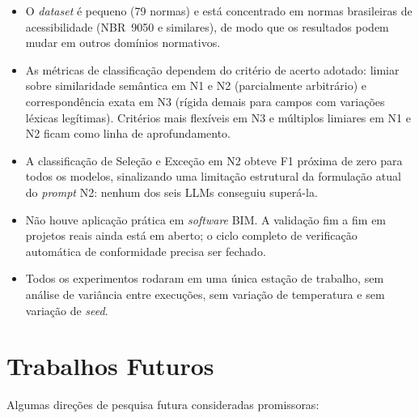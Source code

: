\begin{itemize}
    \item O \textit{dataset} é pequeno (79 normas) e está concentrado em normas brasileiras de acessibilidade (NBR~9050 e similares), de modo que os resultados podem mudar em outros domínios normativos.
    \item As métricas de classificação dependem do critério de acerto adotado: limiar sobre similaridade semântica em N1 e N2 (parcialmente arbitrário) e correspondência exata em N3 (rígida demais para campos com variações léxicas legítimas). Critérios mais flexíveis em N3 e múltiplos limiares em N1 e N2 ficam como linha de aprofundamento.
    \item A classificação de Seleção e Exceção em N2 obteve F1 próxima de zero para todos os modelos, sinalizando uma limitação estrutural da formulação atual do \textit{prompt} N2: nenhum dos seis LLMs conseguiu superá-la.
    \item Não houve aplicação prática em \textit{software} BIM. A validação fim a fim em projetos reais ainda está em aberto; o ciclo completo de verificação automática de conformidade precisa ser fechado.
    \item Todos os experimentos rodaram em uma única estação de trabalho, sem análise de variância entre execuções, sem variação de temperatura e sem variação de \textit{seed}.
\end{itemize}

\section{Trabalhos Futuros}

Algumas direções de pesquisa futura consideradas promissoras:

